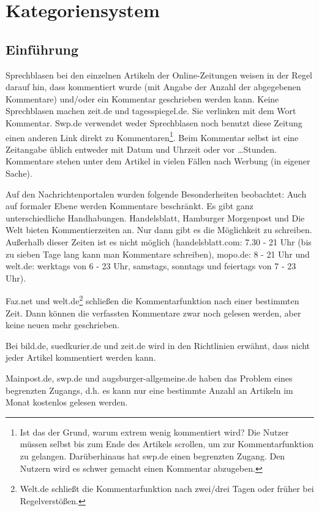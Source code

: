 \chapter{Kategoriensystem}


\section{Einführung}

Sprechblasen bei den einzelnen Artikeln der Online-Zeitungen weisen in der Regel darauf hin, dass kommentiert wurde
(mit Angabe der Anzahl der abgegebenen Kommentare) und/oder ein Kommentar
geschrieben werden kann. Keine Sprechblasen machen zeit.de und tagesspiegel.de. Sie verlinken mit dem Wort
\glqq Kommentar\grqq. Swp.de verwendet weder Sprechblasen noch benutzt diese Zeitung einen anderen 
Link direkt zu Kommentaren\footnote{Ist das der Grund, warum extrem wenig kommentiert wird? Die Nutzer 
müssen selbst bis zum Ende
des Artikels scrollen, um zur Kommentarfunktion zu gelangen. Darüberhinaus hat swp.de einen begrenzten Zugang. 
Den Nutzern wird es schwer gemacht einen Kommentar abzugeben.}.
Beim Kommentar selbst ist eine Zeitangabe üblich
entweder mit Datum und Uhrzeit oder \glqq vor \ldots Stunden\grqq.  Kommentare
stehen unter dem Artikel in vielen Fällen nach Werbung (in eigener Sache).

Auf den Nachrichtenportalen wurden folgende Besonderheiten beobachtet:
Auch auf formaler Ebene werden Kommentare beschränkt. Es gibt ganz
unterschiedliche Handhabungen. Handelsblatt, Hamburger Morgenpost und Die Welt bieten Kommentierzeiten an. 
Nur dann gibt es die Möglichkeit zu schreiben. Außerhalb dieser Zeiten ist es nicht
möglich (handelsblatt.com: 7.30 - 21 Uhr (bis zu sieben Tage lang kann man Kommentare schreiben), mopo.de: 8 - 21 Uhr und 
welt.de: werktags von 6 - 23 Uhr, samstags, sonntags und feiertags von 7 - 23 Uhr).

Faz.net und welt.de\footnote{Welt.de schließt die Kommentarfunktion nach zwei/drei Tagen oder früher bei
  Regelverstößen.} schließen die Kommentarfunktion nach einer bestimmten
Zeit. Dann können die verfassten Kommentare zwar noch gelesen werden, aber keine
neuen mehr geschrieben. 

Bei  bild.de, suedkurier.de und zeit.de wird in den Richtlinien erwähnt, dass nicht jeder Artikel
kommentiert werden kann.

Mainpost.de, swp.de und augsburger-allgemeine.de haben das Problem eines begrenzten
Zugangs, d.h. es kann nur eine bestimmte Anzahl an Artikeln im Monat kostenlos gelesen werden. 

